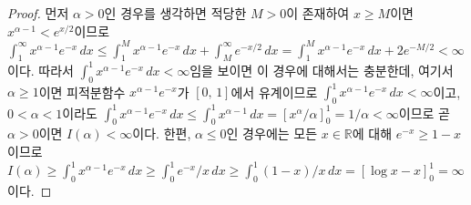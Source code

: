 \begin{proof}
    먼저 $\alpha>0$인 경우를 생각하면 적당한 $M>0$이 존재하여 $x\geq M$이면 $x^{\alpha-1}<e^{x/2}$이므로 $\int_1^\infty x^{\alpha-1}e^{-x}\,dx\leq\int_1^Mx^{\alpha-1}e^{-x}\,dx+\int_M^\infty e^{-x/2}\,dx=\int_1^Mx^{\alpha-1}e^{-x}\,dx+2e^{-M/2}<\infty$이다. 따라서 $\int_0^1x^{\alpha-1}e^{-x}\,dx<\infty$임을 보이면 이 경우에 대해서는 충분한데, 여기서 $\alpha\geq1$이면 피적분함수 $x^{\alpha-1}e^{-x}$가 $[0,\,1]$에서 유계이므로 $\int_0^1x^{\alpha-1}e^{-x}\,dx<\infty$이고, $0<\alpha<1$이라도 $\int_0^1x^{\alpha-1}e^{-x}\,dx\leq\int_0^1x^{\alpha-1}\,dx=[x^\alpha/\alpha]_0^1=1/\alpha<\infty$이므로 곧 $\alpha>0$이면 $I(\alpha)<\infty$이다. 한편, $\alpha\leq0$인 경우에는 모든 $x\in\mathbb{R}$에 대해 $e^{-x}\geq1-x$이므로 $I(\alpha)\geq\int_0^1x^{\alpha-1}e^{-x}\,dx\geq\int_0^1e^{-x}/x\,dx\geq\int_0^1(1-x)/x\,dx=[\log x-x]_0^1=\infty$이다.
\end{proof}

